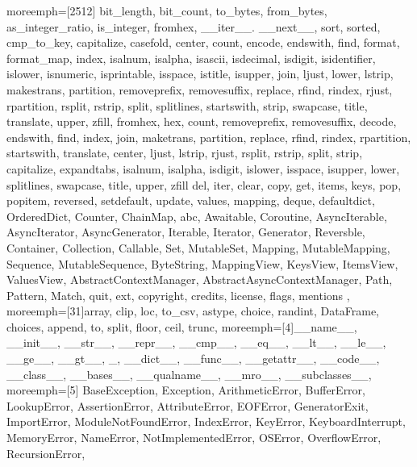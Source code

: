 {  moreemph=[2512]{%
  bit\_length, bit\_count, to\_bytes, from\_bytes, as\_integer\_ratio,
  is\_integer, fromhex,
  \_\_iter\_\_. \_\_next\_\_,
  sort, sorted, cmp\_to\_key,
  capitalize, casefold, center, count, encode, endswith, find, format,
  format\_map, index, isalnum, isalpha, isascii, isdecimal, isdigit,
  isidentifier, islower, isnumeric, isprintable, isspace, istitle, isupper,
  join, ljust, lower, lstrip, makestrans, partition, removeprefix,
  removesuffix, replace, rfind, rindex, rjust, rpartition, rsplit, rstrip,
  split, splitlines, startswith, strip, swapcase, title, translate, upper,
  zfill,
  fromhex, hex,
  count, removeprefix, removesuffix, decode, endswith, find, index, join,
  maketrans, partition, replace, rfind, rindex, rpartition, startswith,
  translate, center, ljust, lstrip, rjust, rsplit, rstrip, split, strip,
  capitalize, expandtabs, isalnum, isalpha, isdigit, islower, isspace,
  isupper, lower, splitlines, swapcase, title, upper, zfill
  del, iter, clear, copy, get, items, keys, pop, popitem, reversed,
  setdefault, update, values, mapping,
  deque, defaultdict, OrderedDict, Counter, ChainMap, abc, Awaitable,
  Coroutine, AsyncIterable, AsyncIterator, AsyncGenerator, Iterable, Iterator,
  Generator, Reversble, Container, Collection, Callable, Set, MutableSet,
  Mapping, MutableMapping, Sequence, MutableSequence, ByteString, MappingView,
  KeysView, ItemsView, ValuesView,
  AbstractContextManager, AbstractAsyncContextManager,
  Path,
  Pattern, Match,
  quit, ext, copyright, credits, license, flags, mentions
  },
  moreemph=[31]{array, clip, loc, to\_csv, astype, choice, randint, DataFrame,
  choices, append, to, split, floor, ceil, trunc},
  moreemph=[4]{\_\_name\_\_, \_\_init\_\_, \_\_str\_\_, \_\_repr\_\_,
  \_\_cmp\_\_, \_\_eq\_\_, \_\_lt\_\_, \_\_le\_\_, \_\_ge\_\_, \_\_gt\_\_, \_,
  \_\_dict\_\_, \_\_func\_\_, \_\_getattr\_\_, \_\_code\_\_, \_\_class\_\_,
  \_\_bases\_\_, \_\_qualname\_\_, \_\_mro\_\_, \_\_subclasses\_\_},
  moreemph=[5]{%
  BaseException, Exception, ArithmeticError, BufferError, LookupError,
  AssertionError, AttributeError, EOFError, GeneratorExit, ImportError,
  ModuleNotFoundError, IndexError, KeyError, KeyboardInterrupt, MemoryError,
  NameError, NotImplementedError, OSError, OverflowError, RecursionError,
}}
